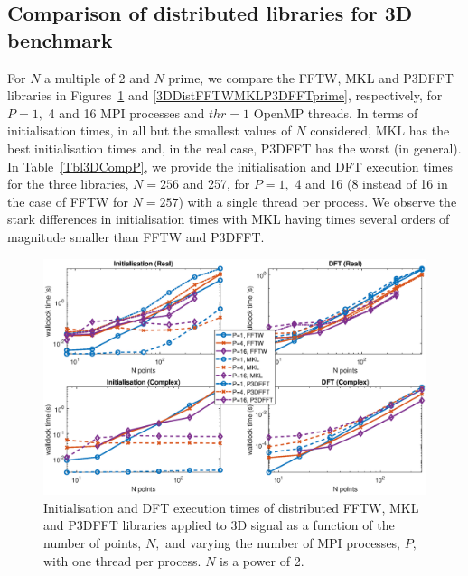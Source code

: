 \documentclass[a4paper]{article}
\begin{document}
\subsection{Comparison of distributed libraries for 3D benchmark}\label{Sec:3DDistComp}

For $N$ a multiple of 2 and $N$ prime, we compare the FFTW, MKL and
P3DFFT libraries in Figures~\ref{3DDistFFTWMKLP3DFFT2} and
\ref{3DDistFFTWMKLP3DFFTprime}, respectively, for $P=1,$ 4 and 16 MPI
processes and $thr=1$ OpenMP threads. In terms of initialisation
times, in all but the smallest values of $N$ considered, MKL has the
best initialisation times and, in the real case, P3DFFT has the worst
(in general). In Table~\ref{Tbl3DCompP}, we provide the
initialisation and DFT execution times for the three libraries,
$N=256$ and 257, for $P=1,$ 4 and 16 (8 instead of 16 in the case of
FFTW for $N=257$) with a single thread per process. We observe the
stark differences in initialisation times with MKL having times
several orders of magnitude smaller than FFTW and P3DFFT.



\begin{figure}[htb]
    \centering
    \includegraphics[width=0.9\linewidth]{../results/fftw_mkl_p3dfft_2_3d_mpi.eps}
  \caption{Initialisation and DFT execution times of distributed FFTW, MKL and P3DFFT libraries applied to 3D signal as a function of the
    number of points, $N,$ and varying the number of MPI processes, $P,$ with one thread per process. $N$ is a power of 2.}
  \label{3DDistFFTWMKLP3DFFT2}
\end{figure}
\end{document}
